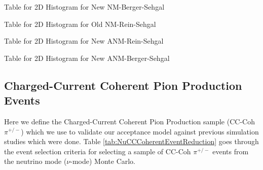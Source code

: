 \documentclass[11pt]{article}
\begin{document}
\newpage
\begin{landscape}
\begin{table}
\centering
\caption{Table for 2D Histogram for New NM-Berger-Sehgal}
\begin{adjustbox}{width=\paperwidth}
\end{adjustbox}
\end{table}
\end{landscape}

\newpage
\begin{landscape}
\begin{table}
\centering
\caption{Table for 2D Histogram for Old NM-Rein-Sehgal}
\begin{adjustbox}{width=\paperwidth}
\end{adjustbox}
\end{table}
\end{landscape}

\newpage
\begin{landscape}
\begin{table}
\centering
\caption{Table for 2D Histogram for New ANM-Rein-Sehgal}
\begin{adjustbox}{width=\paperwidth}
\end{adjustbox}
\end{table}
\end{landscape}

\newpage
\begin{landscape}
\begin{table}
\centering
\caption{Table for 2D Histogram for New ANM-Berger-Sehgal}
\begin{adjustbox}{width=\paperwidth}
\end{adjustbox}
\end{table}
\end{landscape}



\subsection{Charged-Current Coherent Pion Production Events}\label{sub:CCCohPion}

Here we define the Charged-Current Coherent Pion Production sample (CC-Coh $\pi^{+/-}$) which we use to validate our acceptance model against previous simulation studies which were done. Table \ref*{tab:NuCCCoherentEventReduction} goes through the event selection criteria for selecting a sample of CC-Coh $\pi^{+/-}$ events from the neutrino mode ($\nu$-mode) Monte Carlo.
\end{document}
